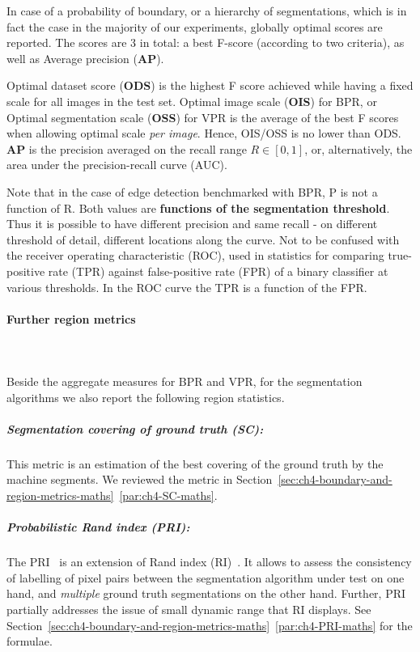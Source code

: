 In case of a probability of boundary, or a hierarchy of segmentations, which is in fact the case in the majority of our experiments, globally optimal scores %
are reported. The scores are 3 in total: a best F-score (according to two criteria), as well as Average precision (\textbf{AP}). 

Optimal dataset score ({\bf ODS}) is the highest F score achieved while having a fixed scale for all images in the test set. 
Optimal image scale ({\bf OIS}) for BPR, or Optimal segmentation scale (\textbf{OSS}) for VPR is the average of the best F scores when allowing optimal scale {\it per image}. Hence, OIS\slash OSS is no lower than ODS. 
{\bf AP} is the precision averaged on the recall range $R\in[0,1]$, or, alternatively, the area under the precision-recall curve (AUC).

Note that in the case of edge detection benchmarked with BPR, P is not a function of R. Both values are {\bf functions of the segmentation threshold}. Thus it is possible to have different precision and same recall - on different threshold of detail, \ie different locations along the curve.
Not to be confused with %
the receiver operating characteristic (ROC), used in statistics for comparing true-positive rate (TPR) against false-positive rate (FPR) of a binary classifier at various thresholds. In the ROC curve the TPR %
is a function of the FPR. %

\paragraph{Further region metrics}\mbox{}\\\mbox{}\\
Beside the aggregate measures for BPR and VPR, for the segmentation algorithms we also report the following region statistics. %
\subparagraph{Segmentation covering of ground truth (SC):} This metric is an estimation of the best covering of the ground truth by the machine segments. We reviewed the metric in Section~\ref*{sec:ch4-boundary-and-region-metrics-maths}~\ref{par:ch4-SC-maths}.

\subparagraph{Probabilistic Rand index (PRI):} The PRI~\cite{UnnikrishnanPH07} is an extension of Rand index (RI)~\cite{rand1971objective}. It allows to assess the consistency of labelling of pixel pairs between the segmentation algorithm under test on one hand, and {\it multiple} ground truth segmentations on the other hand. Further, PRI partially addresses the issue of small dynamic range that RI displays. See Section~\ref*{sec:ch4-boundary-and-region-metrics-maths}~\ref{par:ch4-PRI-maths} for the formulae.


